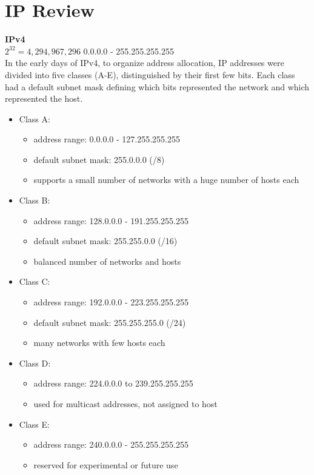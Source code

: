\documentclass{article}
\begin{document}
\section*{IP Review}
\textbf{IPv4}\\
$2^{32} = 4,294,967,296$ 0.0.0.0 - 255.255.255.255\\
In the early days of IPv4, to organize address allocation, IP addresses were divided into five classes (A-E), distinguished by their first few bits. Each class had a default subnet mask defining which bits represented the network and which represented the host.

	\begin{itemize}
		\item Class A:
			\begin{itemize}
				\item address range: 0.0.0.0 - 127.255.255.255
				\item default subnet mask: 255.0.0.0 (/8)
				\item supports a small number of networks with a huge number of hosts each
			\end{itemize}
		\item Class B:
			\begin{itemize}
				\item address range: 128.0.0.0 - 191.255.255.255
				\item default subnet mask: 255.255.0.0 (/16)
				\item balanced number of networks and hosts
			\end{itemize}
		\item Class C:
			\begin{itemize}
				\item address range: 192.0.0.0 - 223.255.255.255
				\item default subnet mask: 255.255.255.0 (/24)
				\item many networks with few hosts each
			\end{itemize}
		\item Class D:
			\begin{itemize}
				\item address range: 224.0.0.0 to 239.255.255.255
				\item used for multicast addresses, not assigned to host
			\end{itemize}
		\item Class E:
			\begin{itemize}
				\item address range: 240.0.0.0 - 255.255.255.255
				\item reserved for experimental or future use
			\end{itemize}
	\end{itemize}
\end{document}
